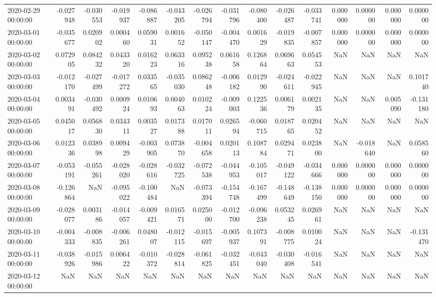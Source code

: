 \begin{tabular}{lrrrrrrrrrrrrrr}
2020-02-29 00:00:00 & -0.027948 & -0.030553 & -0.019937 & -0.086887 & -0.043205 & -0.026794 & -0.031796 & -0.080400 & -0.026487 & -0.033741 & 0.000000 & 0.000000 & 0.000000 & 0.000000 \\
2020-03-01 00:00:00 & -0.035677 & 0.020902 & 0.000460 & 0.059031 & 0.001652 & -0.050147 & -0.004470 & 0.001629 & -0.019835 & -0.007857 & 0.000000 & 0.000000 & 0.000000 & 0.000000 \\
2020-03-02 00:00:00 & 0.072905 & 0.084232 & 0.043320 & 0.016223 & 0.063316 & 0.095238 & 0.061658 & 0.126864 & 0.069663 & 0.054553 & NaN & NaN & NaN & NaN \\
2020-03-03 00:00:00 & -0.012170 & -0.027499 & -0.017272 & 0.033565 & -0.035030 & 0.086248 & -0.006182 & 0.012990 & -0.024611 & -0.022945 & NaN & NaN & NaN & 0.101740 \\
2020-03-04 00:00:00 & 0.003491 & -0.030492 & 0.000924 & 0.010693 & 0.004063 & 0.010224 & -0.009003 & 0.122536 & 0.006179 & 0.002135 & NaN & NaN & 0.005090 & -0.131180 \\
2020-03-05 00:00:00 & 0.045017 & 0.056830 & 0.034311 & 0.003527 & 0.017388 & 0.017011 & 0.026594 & -0.060715 & 0.018765 & 0.020452 & NaN & NaN & NaN & NaN \\
2020-03-06 00:00:00 & 0.012336 & 0.038998 & 0.009429 & -0.003905 & 0.073870 & -0.004658 & 0.020113 & 0.108784 & 0.029471 & 0.023800 & NaN & -0.018640 & NaN & 0.058560 \\
2020-03-07 00:00:00 & -0.053191 & -0.055261 & -0.028020 & -0.028616 & -0.032725 & -0.072538 & -0.044953 & -0.105017 & -0.049122 & -0.034666 & 0.000000 & 0.000000 & 0.000000 & 0.000000 \\
2020-03-08 00:00:00 & -0.126864 & NaN & -0.095022 & -0.100484 & NaN & -0.073394 & -0.154748 & -0.167499 & -0.148649 & -0.138150 & 0.000000 & 0.000000 & 0.000000 & 0.000000 \\
2020-03-09 00:00:00 & -0.028077 & 0.003186 & -0.014057 & -0.009421 & 0.016571 & 0.025000 & -0.012700 & -0.096238 & 0.053245 & 0.026961 & NaN & NaN & NaN & NaN \\
2020-03-10 00:00:00 & -0.004333 & -0.008835 & -0.006261 & 0.048007 & -0.012115 & -0.015697 & -0.005937 & 0.107391 & -0.008775 & 0.010024 & NaN & NaN & NaN & -0.131470 \\
2020-03-11 00:00:00 & -0.038926 & -0.015986 & 0.006422 & -0.010372 & -0.028814 & -0.061825 & -0.032451 & -0.043040 & -0.030408 & -0.016541 & NaN & NaN & NaN & NaN \\
2020-03-12 00:00:00 & NaN & NaN & NaN & NaN & NaN & NaN & NaN & NaN & NaN & NaN & NaN & NaN & NaN & NaN \\

\end{tabular}
